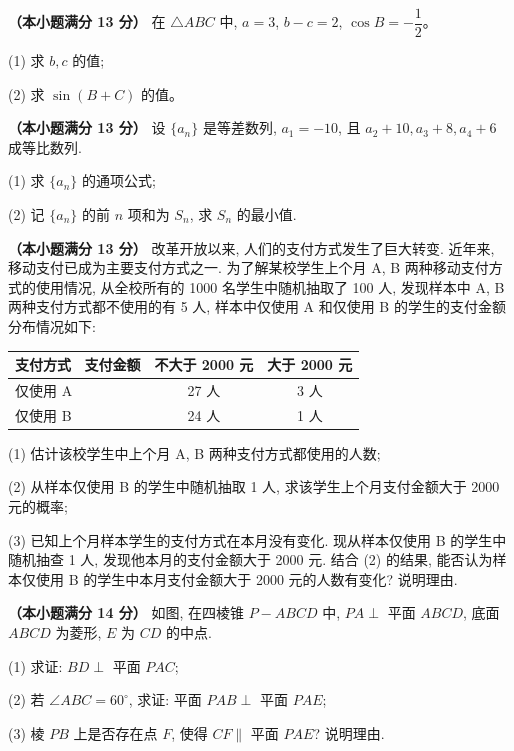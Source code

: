 \begin{question}
\textbf{（本小题满分 13 分）} 
在 $\triangle ABC$ 中, $a = 3$, $b - c = 2$, $\cos B = -\dfrac{1}{2}$。

(1) 求 $b, c$ 的值;

(2) 求 $\sin(B + C)$ 的值。

\end{question}
\begin{question}
\textbf{（本小题满分 13 分）} 
设 $\{a_n\}$ 是等差数列, $a_1 = -10$, 且 $a_2 + 10, a_3 + 8, a_4 + 6$ 成等比数列.

(1) 求 $\{a_n\}$ 的通项公式;

(2) 记 $\{a_n\}$ 的前 $n$ 项和为 $S_n$, 求 $S_n$ 的最小值.

\end{question}
\begin{question}
\textbf{（本小题满分 13 分）} 
改革开放以来, 人们的支付方式发生了巨大转变. 近年来, 移动支付已成为主要支付方式之一. 为了解某校学生上个月 A, B 两种移动支付方式的使用情况, 从全校所有的 1000 名学生中随机抽取了 100 人, 发现样本中 A, B 两种支付方式都不使用的有 5 人, 样本中仅使用 A 和仅使用 B 的学生的支付金额分布情况如下:

\begin{center}
\begin{tabular}{lcc}
\toprule
支付方式 \ 支付金额 & 不大于 2000 元 & 大于 2000 元 \\
\midrule
仅使用 A & 27 人 & 3 人 \\
仅使用 B & 24 人 & 1 人 \\
\bottomrule
\end{tabular}
\end{center}

(1) 估计该校学生中上个月 A, B 两种支付方式都使用的人数;

(2) 从样本仅使用 B 的学生中随机抽取 1 人, 求该学生上个月支付金额大于 2000 元的概率;

(3) 已知上个月样本学生的支付方式在本月没有变化. 现从样本仅使用 B 的学生中随机抽查 1 人, 发现他本月的支付金额大于 2000 元. 结合 (2) 的结果, 能否认为样本仅使用 B 的学生中本月支付金额大于 2000 元的人数有变化? 说明理由.

\Needspace{0.4\textheight}
\end{question}
\begin{question}
\textbf{（本小题满分 14 分）} 
如图, 在四棱锥 $P-ABCD$ 中, $PA \perp$ 平面 $ABCD$, 底面 $ABCD$ 为菱形, $E$ 为 $CD$ 的中点.
\nopagebreak[4]
\begin{center}\end{center}
\nopagebreak[4]
(1) 求证: $BD \perp$ 平面 $PAC$;

(2) 若 $\angle ABC = 60^\circ$, 求证: 平面 $PAB \perp$ 平面 $PAE$;

(3) 棱 $PB$ 上是否存在点 $F$, 使得 $CF \parallel$ 平面 $PAE$? 说明理由.

\end{question}
